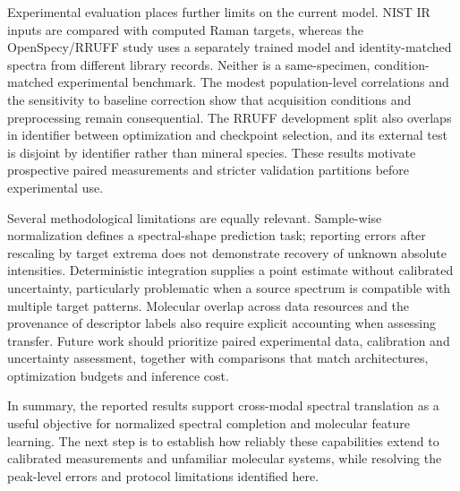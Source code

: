 Experimental evaluation places further limits on the current model. NIST IR inputs are compared with computed Raman targets, whereas the OpenSpecy/RRUFF study uses a separately trained model and identity-matched spectra from different library records. Neither is a same-specimen, condition-matched experimental benchmark. The modest population-level correlations and the sensitivity to baseline correction show that acquisition conditions and preprocessing remain consequential. The RRUFF development split also overlaps in identifier between optimization and checkpoint selection, and its external test is disjoint by identifier rather than mineral species. These results motivate prospective paired measurements and stricter validation partitions before experimental use.

Several methodological limitations are equally relevant. Sample-wise normalization defines a spectral-shape prediction task; reporting errors after rescaling by target extrema does not demonstrate recovery of unknown absolute intensities. Deterministic integration supplies a point estimate without calibrated uncertainty, particularly problematic when a source spectrum is compatible with multiple target patterns. Molecular overlap across data resources and the provenance of descriptor labels also require explicit accounting when assessing transfer. Future work should prioritize paired experimental data, calibration and uncertainty assessment, together with comparisons that match architectures, optimization budgets and inference cost.

In summary, the reported results support cross-modal spectral translation as a useful objective for normalized spectral completion and molecular feature learning. The next step is to establish how reliably these capabilities extend to calibrated measurements and unfamiliar molecular systems, while resolving the peak-level errors and protocol limitations identified here.
